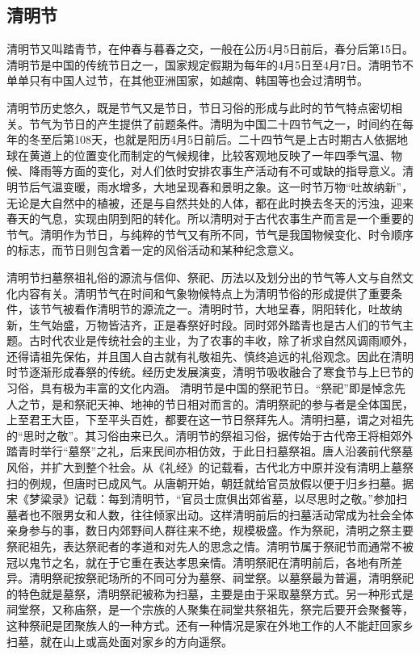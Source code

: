 \subsection{清明节}
清明节又叫踏青节，在仲春与暮春之交，一般在公历4月5日前后，春分后第15日。清明节是中国的传统节日之一，国家规定假期为每年的4月5日至4月7日。清明节不单单只有中国人过节，在其他亚洲国家，如越南、韩国等也会过清明节。

清明节历史悠久，既是节气又是节日，节日习俗的形成与此时的节气特点密切相关。节气为节日的产生提供了前题条件。清明为中国二十四节气之一，时间约在每年的冬至后第108天，也就是阳历4月5日前后。二十四节气是上古时期古人依据地球在黄道上的位置变化而制定的气候规律，比较客观地反映了一年四季气温、物候、降雨等方面的变化，对人们依时安排农事生产活动有不可或缺的指导意义。清明节后气温变暖，雨水增多，大地呈现春和景明之象。这一时节万物“吐故纳新”，无论是大自然中的植被，还是与自然共处的人体，都在此时换去冬天的污浊，迎来春天的气息，实现由阴到阳的转化。所以清明对于古代农事生产而言是一个重要的节气。清明作为节日，与纯粹的节气又有所不同，节气是我国物候变化、时令顺序的标志，而节日则包含着一定的风俗活动和某种纪念意义。

清明节扫墓祭祖礼俗的源流与信仰、祭祀、历法以及划分出的节气等人文与自然文化内容有关。清明节气在时间和气象物候特点上为清明节俗的形成提供了重要条件，该节气被看作清明节的源流之一。清明时节，大地呈春，阴阳转化，吐故纳新，生气始盛，万物皆洁齐，正是春祭好时段。同时郊外踏青也是古人们的节气主题。古时代农业是传统社会的主业，为了农事的丰收，除了祈求自然风调雨顺外，还得请祖先保佑，并且国人自古就有礼敬祖先、慎终追远的礼俗观念。因此在清明时节逐渐形成春祭的传统。经历史发展演变，清明节吸收融合了寒食节与上巳节的习俗，具有极为丰富的文化内涵。
清明节是中国的祭祀节日。“祭祀”即是悼念先人之节，是和祭祀天神、地神的节日相对而言的。清明祭祀的参与者是全体国民，上至君王大臣，下至平头百姓，都要在这一节日祭拜先人。清明扫墓，谓之对祖先的“思时之敬”。其习俗由来已久。清明节的祭祖习俗，据传始于古代帝王将相郊外踏青时举行“墓祭”之礼，后来民间亦相仿效，于此日扫墓祭祖。唐人沿袭前代祭墓风俗，并扩大到整个社会。从《礼经》的记载看，古代北方中原并没有清明上墓祭扫的例规，但唐时已成风气。从唐朝开始，朝廷就给官员放假以便于归乡扫墓。据宋《梦粱录》记载：每到清明节，“官员士庶俱出郊省墓，以尽思时之敬。”参加扫墓者也不限男女和人数，往往倾家出动。这样清明前后的扫墓活动常成为社会全体亲身参与的事，数日内郊野间人群往来不绝，规模极盛。作为祭祀，清明之祭主要祭祀祖先，表达祭祀者的孝道和对先人的思念之情。清明节属于祭祀节而通常不被冠以鬼节之名，就在于它重在表达孝思亲情。清明祭祀在清明前后，各地有所差异。清明祭祀按祭祀场所的不同可分为墓祭、祠堂祭。以墓祭最为普遍，清明祭祀的特色就是墓祭，清明祭祀被称为扫墓，主要是由于采取墓祭方式。另一种形式是祠堂祭，又称庙祭，是一个宗族的人聚集在祠堂共祭祖先，祭完后要开会聚餐等，这种祭祀是团聚族人的一种方式。还有一种情况是家在外地工作的人不能赶回家乡扫墓，就在山上或高处面对家乡的方向遥祭。

